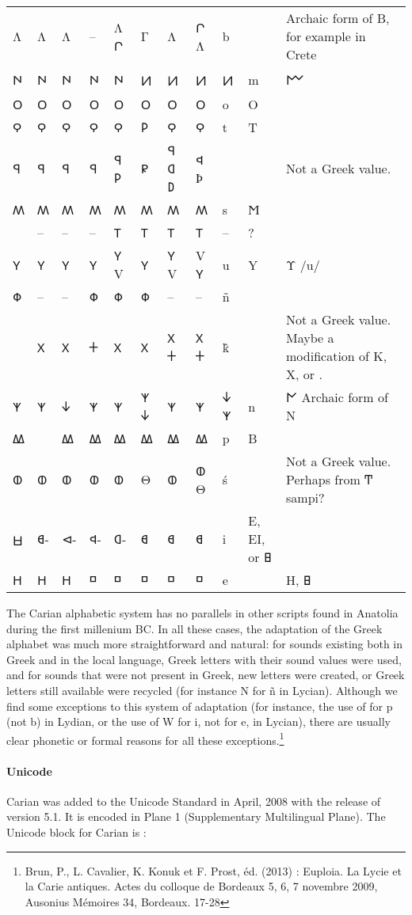 \begin{longtable}[L]{ 
>{\carian}l|
>{\carian}l| 
>{\carian}l| 
>{\carian}l| 
>{\carian}l| 
>{\carian}l| 
>{\carian}l| 
>{\carian}l| 
>{\panunicode}l| 
>{\panunicode}l|
p{3.5cm}}
Λ	&Λ	&Λ &--	&Λ 𐊬	&Γ	&Λ	 &𐊬 Λ	&b  &  & Archaic form of Β, for example in Crete\\
𐊪	&𐊪	&𐊪	&𐊪	&𐊪 &𝈋	&𝈋	&𝈋	 &𝈋	    &m	&𐌌 \\
𐊫	&𐊫	&𐊫	&𐊫	&𐊫 &𐊫	&𐊫	&𐊫	 &o	    &Ο  &\\
𐊭	&𐊭	&𐊭	&𐊭	&𐊭	&𐌓	&𐊭	&𐊭	 &t	    &Τ  &\\
𐤭	&𐤭	&	𐤭	&𐤭     & 𐤭 𐌓   & 𐊯    & 𐤭 𐤧 𐌃   & 𐊮 Ϸ &{\panunicode š}& &Not a Greek value.\\
𐊰	&𐊰	&𐊰	&𐊰	&𐊰	   &𐊰	&𐊰	&𐊰	  &s	&Ϻ\\
&--&--&--&𐊱	&𐊱	&𐊱		&𐊱	&-- &? &\\
𐊲	&𐊲	&𐊲	&𐊲	&𐊲 V	&𐊲	&𐊲 V	&V 𐊲	&u	&Y &Υ /u/\\
𐊳	&--&--	&𐊳	&𐊳	&𐊳	&-- &--		&\panunicode ñ&\\
	&𐊴	&𐊴	&𐊛	&𐊴	&𐊴	&𐊴 𐊛	&𐊴 𐊛	&k̂	&&Not a Greek value. Maybe a modification of Κ, Χ, or \textcarian{𐊨}.\\
𐊵	&𐊵 &𐊜	&𐊵	&𐊵	&𐊵 𐊜	&𐊵	&𐊵	&𐊜 𐊵	&n	& {\panunicode 𐌍} Archaic form of Ν\\	
𐊷	&	&𐊷	&𐊷	&𐊷	&𐊷	&𐊷	&𐊷	&p	&Β\\
𐊸	&𐊸	&𐊸	&𐊸	&𐊸	&Θ	&𐊸	&𐊸 Θ	&ś	& &Not a Greek value. Perhaps from Ͳ sampi?\\
𝈣	&𐊹-	&⊲-	&𐊮-	&𐤧-	&𐊹	&𐊹	&𐊹	&i	&Ε, ΕΙ, or {\panunicode 𐌇}\\
𐋏	&𐋏	&𐋏	&𐊺	&𐊺	&𐊺	&𐊺	&𐊺	&e	&&Η, {\panunicode 𐌇}\\
\end{longtable}


The Carian alphabetic system has no parallels in other scripts found in Anatolia during the first millenium BC. In all these cases, 
the adaptation of the Greek alphabet was much more straightforward and natural: for sounds existing both in Greek and in
the local language, Greek letters with their sound values were used, and for sounds that were not present in Greek, new
letters were created, or Greek letters still available were recycled (for instance N for {\panunicode ñ} in Lycian). Although we find some
exceptions to this system of adaptation (for instance, the use of  for p (not b) in Lydian, or the use of W for i, not for e,
in Lycian), there are usually clear phonetic or formal reasons for all these exceptions.\footnote{Brun, P., L. Cavalier, K. Konuk et F. Prost, éd. (2013) : Euploia. La Lycie et la Carie antiques. Actes du colloque de Bordeaux 5, 6, 7 novembre 2009, Ausonius Mémoires 34, Bordeaux. 17-28} 


\paragraph{Unicode}
Carian was added to the Unicode Standard in April, 2008 with the release of version 5.1. It is encoded in Plane 1 (Supplementary Multilingual Plane).
The Unicode block for Carian is :


